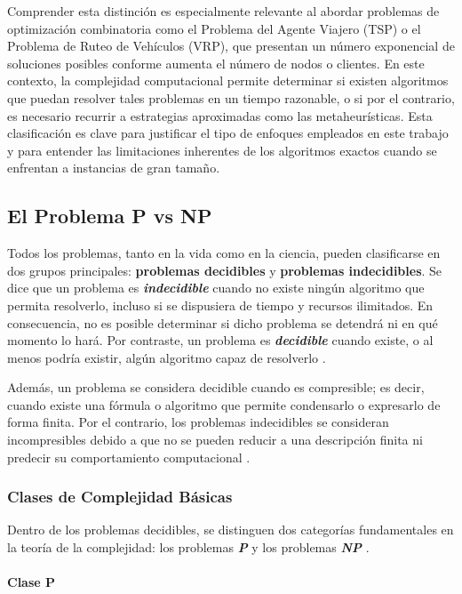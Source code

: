 \documentclass[12pt,titlepage,twoside,openright]{book}
\begin{document}
Comprender esta distinción es especialmente relevante al abordar problemas de optimización combinatoria como el Problema del Agente Viajero (TSP) o el Problema de Ruteo de Vehículos (VRP), que presentan un número exponencial de soluciones posibles conforme aumenta el número de nodos o clientes. En este contexto, la complejidad computacional permite determinar si existen algoritmos que puedan resolver tales problemas en un tiempo razonable, o si por el contrario, es necesario recurrir a estrategias aproximadas como las metaheurísticas. Esta clasificación es clave para justificar el tipo de enfoques empleados en este trabajo y para entender las limitaciones inherentes de los algoritmos exactos cuando se enfrentan a instancias de gran tamaño.

\subsection{El Problema P vs NP}

Todos los problemas, tanto en la vida como en la ciencia, pueden clasificarse en dos grupos principales: \textbf{problemas decidibles} y \textbf{problemas indecidibles}. Se dice que un problema es \textbf{\emph{indecidible}} cuando no existe ningún algoritmo que permita resolverlo, incluso si se dispusiera de tiempo y recursos ilimitados. En consecuencia, no es posible determinar si dicho problema se detendrá ni en qué momento lo hará. Por contraste, un problema es \textbf{\emph{decidible}} cuando existe, o al menos podría existir, algún algoritmo capaz de resolverlo \citep{maldonado2013problema}.

Además, un problema se considera decidible cuando es compresible; es decir, cuando existe una fórmula o algoritmo que permite condensarlo o expresarlo de forma finita. Por el contrario, los problemas indecidibles se consideran incompresibles debido a que no se pueden reducir a una descripción finita ni predecir su comportamiento computacional \citep{maldonado2013problema}.

\subsubsection{Clases de Complejidad Básicas}

Dentro de los problemas decidibles, se distinguen dos categorías fundamentales en la teoría de la complejidad: los problemas \textbf{\emph{P}} y los problemas \textbf{\emph{NP}} \citep{maldonado2013problema}.

\paragraph{Clase P}
\end{document}
